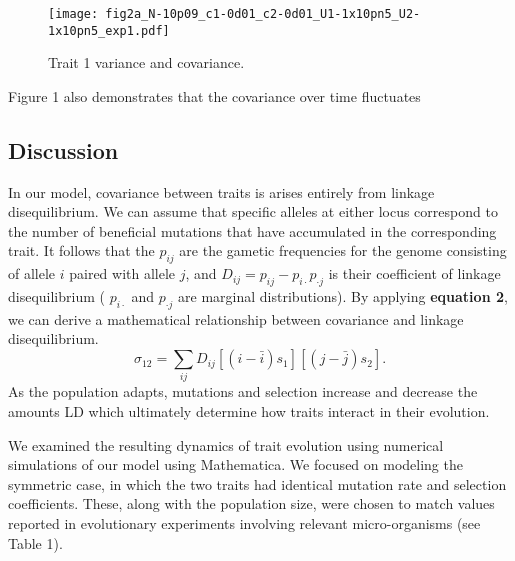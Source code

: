 \documentclass[9pt,twocolumn,twoside]{gsajnl}
\begin{document}
\begin{figure}
\texttt{[image: fig2a\_N-10p09\_c1-0d01\_c2-0d01\_U1-1x10pn5\_U2-1x10pn5\_exp1.pdf]}
\label{Figure 2.}
\caption{Trait 1 variance and covariance.}
\end{figure}
Figure 1 also demonstrates that the covariance over time fluctuates 

\subsection{Discussion}

In our model, covariance between traits is arises entirely from linkage disequilibrium. We can assume that specific alleles at either locus correspond to the number of beneficial mutations that have accumulated in the corresponding trait.  It follows that the $p_{ij}$ are the gametic frequencies for the genome consisting of allele $i$ paired with allele $j$, and $D_{ij} = p_{ij}-p_{i\cdot} p_{\cdot j}$ is their coefficient of linkage disequilibrium ( $p_{i\cdot}$ and $p_{\cdot j}$ are marginal distributions). By applying \textbf{equation 2}, we can derive a mathematical relationship between covariance and linkage disequilibrium.
% 
% 
\begin{equation}
\sigma_{12}=\sum_{ij}D_{ij}[(i-\bar{i})s_1][(j-\bar{j})s_2]. 
\end{equation} 
As the population adapts, mutations and selection  increase and decrease the amounts LD which ultimately determine how traits interact in their evolution.\par

We examined the resulting dynamics of trait evolution using numerical simulations of our model using Mathematica. We focused on modeling the symmetric case, in which the two traits had identical mutation rate and selection coefficients. These, along with the population size, were chosen to match values reported in evolutionary experiments involving relevant micro-organisms (see Table 1). 
\end{document}
